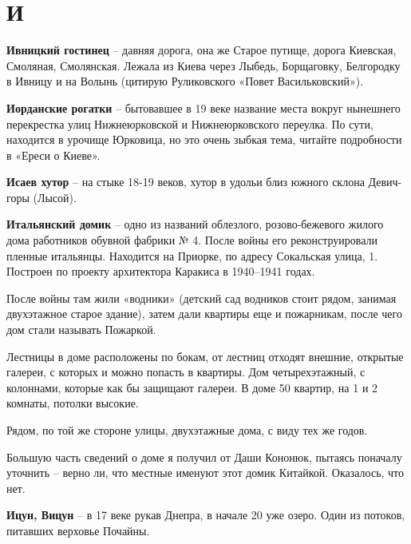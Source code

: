 \chapter*{И}


\textbf{Ивницкий гостинец} – давняя дорога, она же Старое путище, дорога Киевская, Смоляная, Смолянская. Лежала из Киева через Лыбедь, Борщаговку, Белгородку в Ивницу и на Волынь (цитирую Руликовского «Повет Васильковский»).\\ 

\medskip

\textbf{Иорданские рогатки} – бытовавшее в 19 веке название места вокруг нынешнего перекрестка улиц Нижнеюрковской и Нижнеюрковского переулка. По сути, находится в урочище Юрковица, но это очень зыбкая тема, читайте подробности в «Ереси о Киеве».\\

\medskip

\textbf{Исаев хутор} – на стыке 18-19 веков, хутор в удольи близ южного склона Девич-горы (Лысой).\\

\medskip

\textbf{Итальянский домик} – одно из названий облезлого, розово-бежевого жилого дома работников обувной фабрики № 4. После войны его реконструировали пленные итальянцы. Находится на Приорке, по адресу Сокальская улица, 1. Построен по проекту архитектора Каракиса в 1940–1941 годах. 

После войны там жили «водники» (детский сад водников стоит рядом, занимая двухэтажное старое здание), затем дали квартиры еще и пожарникам, после чего дом стали называть Пожаркой.

Лестницы в доме расположены по бокам, от лестниц отходят внешние, открытые галереи, с которых и можно попасть в квартиры. Дом четырехэтажный, с колоннами, которые как бы защищают галереи. В доме 50 квартир, на 1 и 2 комнаты, потолки высокие.

Рядом, по той же стороне улицы, двухэтажные дома, с виду тех же годов.

Большую часть сведений о доме я получил от Даши Кононюк, пытаясь поначалу уточнить – верно ли, что местные именуют этот домик Китайкой. Оказалось, что нет.\\

\medskip

\textbf{Ицун, Вицун} – в 17 веке рукав Днепра, в начале 20 уже озеро. Один из потоков, питавших верховье Почайны.
